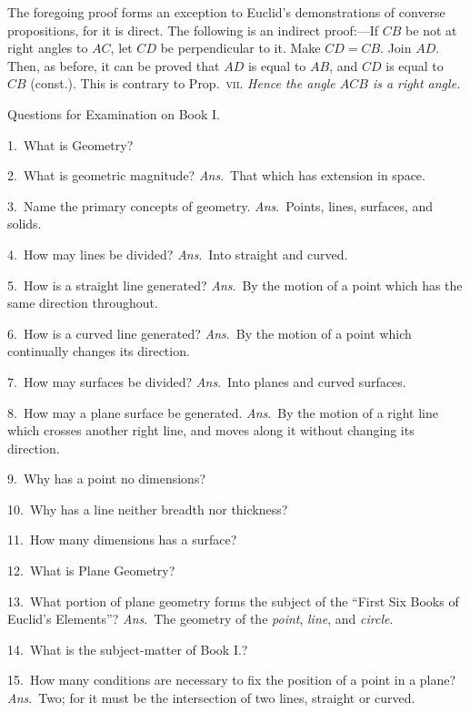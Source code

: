 \documentclass[oneside]{book}
\newcommand\exhead[1]{
\Needspace*{5\baselineskip}\begin{center}
\textsf{#1}
\end{center}
}
\begin{document}
\begin{footnotesize}
The foregoing proof forms an exception to Euclid's demonstrations
of converse propositions, for it
is direct. The following is an indirect
proof:---If $CB$ be not at right
angles to $AC$, let $CD$ be perpendicular
to it. Make $CD = CB$. Join $AD$.
Then, as before, it can be proved
that $AD$ is equal to $AB$, and $CD$ is
equal to $CB$ (const.). This is contrary
to Prop.~\textsc{vii}. \emph{Hence the angle $ACB$ is a right angle.}
\par\end{footnotesize}

\exhead{Questions for Examination on Book I.}

\begin{footnotesize}
1.~What is Geometry?

2.~What is geometric magnitude? \emph{Ans}.~That which has extension
in space.

3.~Name the primary concepts of geometry. \emph{Ans}.~Points,
lines, surfaces, and solids.

4.~How may lines be divided? \emph{Ans}.~Into straight and curved.

5.~How is a straight line generated? \emph{Ans}.~By the motion of
a point which has the same direction throughout.

6.~How is a curved line generated? \emph{Ans}.~By the motion of a
point which continually changes its direction.

7.~How may surfaces be divided? \emph{Ans}.~Into planes and
curved surfaces.

8.~How may a plane surface be generated. \emph{Ans}.~By the
motion of a right line which crosses another right line, and
moves along it without changing its direction.

9.~Why has a point no dimensions?

10.~Why has a line neither breadth nor thickness?

11.~How many dimensions has a surface?

12.~What is Plane Geometry?

13.~What portion of plane geometry forms the subject of the
``First Six Books of Euclid's Elements''? \emph{Ans}.~The geometry
of the \emph{point}, \emph{line}, and \emph{circle}.

14.~What is the subject-matter of Book I.?

15.~How many conditions are necessary to fix the position of a
point in a plane? \emph{Ans}.~Two; for it must be the intersection of
two lines, straight or curved.


\end{footnotesize}
\end{document}
